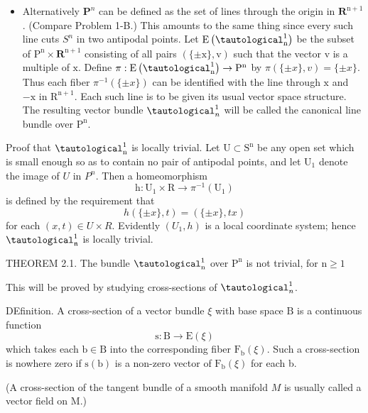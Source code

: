 \documentclass[10pt]{article}
\begin{document}
\begin{itemize}
  \item Alternatively $\mathbf{P}^{n}$ can be defined as the set of lines through the origin in $\mathbf{R}^{\mathrm{n}+1}$. (Compare Problem 1-B.) This amounts to the same thing since every such line cuts $S^{n}$ in two antipodal points. Let $\mathrm{E}\left(\tautological_{\mathrm{n}}^{1}\right)$ be the subset of $\mathrm{P}^{\mathrm{n}} \times \mathbf{R}^{\mathrm{n}+1}$ consisting of all pairs $(\{\pm \mathrm{x}\}, \mathrm{v})$ such that the vector $\mathrm{v}$ is a multiple of $\mathrm{x}$. Define $\pi: \mathrm{E}\left(\tautological_{\mathrm{n}}^{1}\right) \rightarrow \mathrm{P}^{\mathrm{n}}$ by $\pi(\{\pm x\}, v)=\{\pm x\}$. Thus each fiber $\pi^{-1}(\{\pm x\})$ can be identified with the line through $\mathrm{x}$ and $-\mathrm{x}$ in $\mathrm{R}^{\mathrm{n}+1}$. Each such line is to be given its usual vector space structure. The resulting vector bundle $\tautological_{n}^{1}$ will be called the canonical line bundle over $\mathrm{P}^{\mathrm{n}}$.
\end{itemize}
Proof that $\tautological_{\mathrm{n}}^{1}$ is locally trivial. Let $\mathrm{U} \subset \mathrm{S}^{\mathrm{n}}$ be any open set which is small enough so as to contain no pair of antipodal points, and let $\mathrm{U}_{1}$ denote the image of $U$ in $P^{n}$. Then a homeomorphism
$$
\mathrm{h}: \mathrm{U}_{1} \times \mathrm{R} \rightarrow \pi^{-1}\left(\mathrm{U}_{1}\right)
$$
is defined by the requirement that
$$
h(\{\pm x\}, t)=(\{\pm x\}, t x)
$$
for each $(x, t) \in U \times R$. Evidently $\left(U_{1}, h\right)$ is a local coordinate system; hence $\tautological_{\mathfrak{n}}^{1}$ is locally trivial.

THEOREM 2.1. The bundle $\tautological_{\mathrm{n}}^{1}$ over $\mathrm{P}^{\mathrm{n}}$ is not trivial, for $\mathrm{n} \geq 1$

This will be proved by studying cross-sections of $\tautological_{n}^{1}$.

DEfinition. A cross-section of a vector bundle $\xi$ with base space $\mathrm{B}$ is a continuous function
$$
\mathrm{s}: \mathrm{B} \rightarrow \mathrm{E}(\xi)
$$
which takes each $\mathrm{b} \in \mathrm{B}$ into the corresponding fiber $\mathrm{F}_{\mathrm{b}}(\xi)$. Such a cross-section is nowhere zero if $\mathrm{s}(\mathrm{b})$ is a non-zero vector of $\mathrm{F}_{\mathrm{b}}(\xi)$ for each b.

(A cross-section of the tangent bundle of a smooth manifold $M$ is usually called a vector field on M.)
\end{document}
